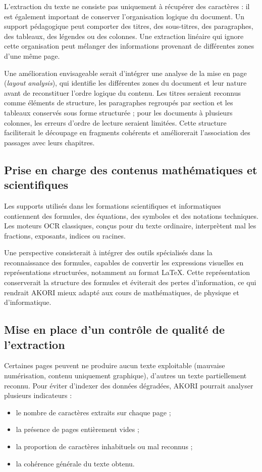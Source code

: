 \documentclass[12pt,a4paper,oneside]{report}
\begin{document}
L'extraction du texte ne consiste pas uniquement à récupérer des caractères : il est également important de conserver l'organisation logique du document. Un support pédagogique peut comporter des titres, des sous-titres, des paragraphes, des tableaux, des légendes ou des colonnes. Une extraction linéaire qui ignore cette organisation peut mélanger des informations provenant de différentes zones d'une même page.

Une amélioration envisageable serait d'intégrer une analyse de la mise en page (\emph{layout analysis}), qui identifie les différentes zones du document et leur nature avant de reconstituer l'ordre logique du contenu. Les titres seraient reconnus comme éléments de structure, les paragraphes regroupés par section et les tableaux conservés sous forme structurée ; pour les documents à plusieurs colonnes, les erreurs d'ordre de lecture seraient limitées. Cette structure faciliterait le découpage en fragments cohérents et améliorerait l'association des passages avec leurs chapitres.

\subsection{Prise en charge des contenus mathématiques et scientifiques}

Les supports utilisés dans les formations scientifiques et informatiques contiennent des formules, des équations, des symboles et des notations techniques. Les moteurs OCR classiques, conçus pour du texte ordinaire, interprètent mal les fractions, exposants, indices ou racines.

Une perspective consisterait à intégrer des outils spécialisés dans la reconnaissance des formules, capables de convertir les expressions visuelles en représentations structurées, notamment au format LaTeX. Cette représentation conserverait la structure des formules et éviterait des pertes d'information, ce qui rendrait AKORI mieux adapté aux cours de mathématiques, de physique et d'informatique.

\subsection{Mise en place d'un contrôle de qualité de l'extraction}

Certaines pages peuvent ne produire aucun texte exploitable (mauvaise numérisation, contenu uniquement graphique), d'autres un texte partiellement reconnu. Pour éviter d'indexer des données dégradées, AKORI pourrait analyser plusieurs indicateurs :
\begin{itemize}
  \item le nombre de caractères extraits sur chaque page ;
  \item la présence de pages entièrement vides ;
  \item la proportion de caractères inhabituels ou mal reconnus ;
  \item la cohérence générale du texte obtenu.
\end{itemize}
\end{document}
